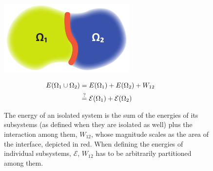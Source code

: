 \begin{figure}
\begin{minipage}{0.5\textwidth}
\centering \includegraphics{chapters/chapter3/figures/blob.pdf}
\end{minipage}
\begin{minipage}{0.4\textwidth}
\begin{align*}
  E({\mathrm\Omega}_{1}\cup{\mathrm\Omega}_2) &= E({\mathrm\Omega}_1) + E({\mathrm\Omega}_2) + W_{12} \qquad \\
  & \overset{?}{=}\mathcal{E}({\mathrm\Omega}_1)+\mathcal{E}({\mathrm\Omega}_2)
\end{align*}
\end{minipage}
\caption{
	The energy of an isolated system is the sum of the energies of its subsystems (as defined when they are isolated as well) plus the interaction among them, $W_{12}$, whose magnitude scales as the area of the interface, depicted in red. When defining the energies of individual subsystems, $\mathcal{E}$, $W_{12}$ has to be arbitrarily partitioned among them. \label{fig:energy-partition}}
\end{figure}


